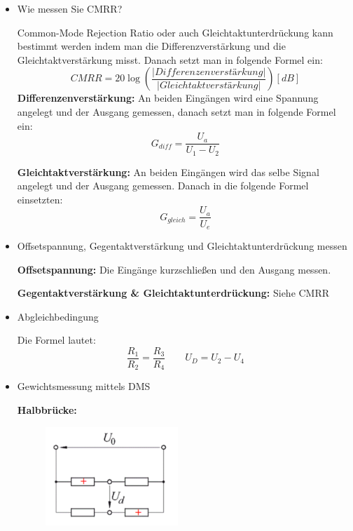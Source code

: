 \documentclass{article}
\begin{document}
\begin{itemize}
\item Wie messen Sie CMRR? 

Common-Mode Rejection Ratio oder auch Gleichtaktunterdrückung kann bestimmt werden indem man die Differenzverstärkung und die Gleichtaktverstärkung misst. Danach setzt man in folgende Formel ein: 
\begin{equation}
CMRR = 20 \log \left( \frac{|Differenzenverstärkung|}{|Gleichtaktverstärkung|} \right) [dB]
\end{equation}
\textbf{Differenzenverstärkung:} An beiden Eingängen wird eine Spannung angelegt und der Ausgang gemessen, danach setzt man in folgende Formel ein: 
\begin{equation}
G_{diff} = \frac{U_a}{U_1-U_2}
\end{equation}

\textbf{Gleichtaktverstärkung:} An beiden Eingängen wird das selbe Signal angelegt und der Ausgang gemessen. Danach in die folgende Formel einsetzten: 
\begin{equation}
G_{gleich} = \frac{U_a}{U_e}
\end{equation}


\item Offsetspannung, Gegentaktverstärkung und Gleichtaktunterdrückung messen

\textbf{Offsetspannung: } Die Eingänge kurzschließen und den Ausgang messen. 

\textbf{Gegentaktverstärkung \& Gleichtaktunterdrückung: } Siehe CMRR
\item Abgleichbedingung 

Die Formel lautet: 
\begin{equation}
\frac{R_1}{R_2} = \frac{R_3}{R_4}  \quad \quad
U_D = U_2 - U_4
\end{equation}

\item Gewichtsmessung mittels DMS 

\textbf{Halbbrücke:}  
\begin{figure}[h]
\centering
\includegraphics[width=5cm]{pic/halbbrucke.png}
\end{figure}


\end{itemize}
\end{document}

